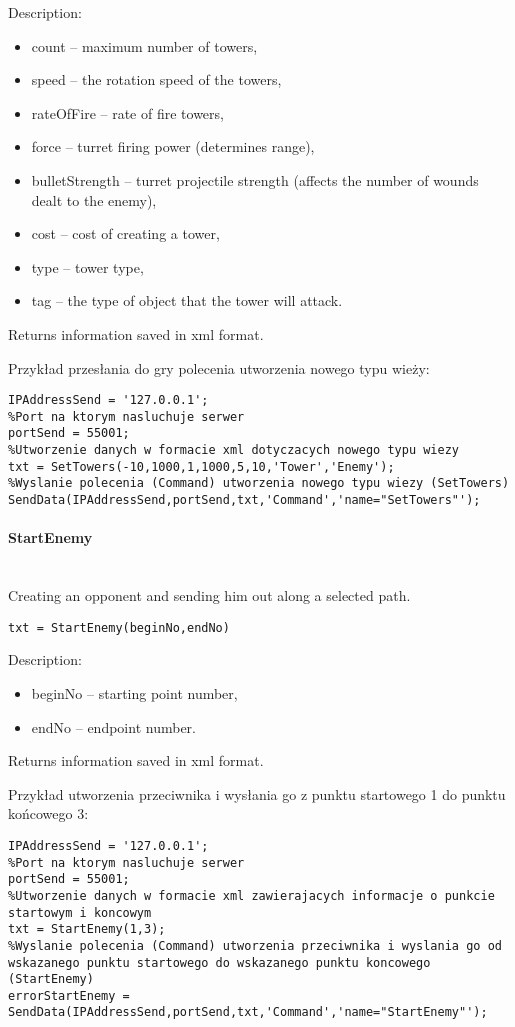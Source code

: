 Description:
\begin{itemize}
\item count -- maximum number of towers,
\item speed -- the rotation speed of the towers,
\item rateOfFire -- rate of fire towers,
\item force -- turret firing power (determines range),
\item bulletStrength -- turret projectile strength (affects the number of wounds dealt to the enemy),
\item cost -- cost of creating a tower,
\item type -- tower type,
\item tag -- the type of object that the tower will attack.
\end{itemize}

Returns information saved in xml format.

Przykład przesłania do gry polecenia utworzenia nowego typu wieży:
\begin{lstlisting}[style=Matlab-editor]
%Adres serwera
IPAddressSend = '127.0.0.1';
%Port na ktorym nasluchuje serwer
portSend = 55001;
%Utworzenie danych w formacie xml dotyczacych nowego typu wiezy
txt = SetTowers(-10,1000,1,1000,5,10,'Tower','Enemy');
%Wyslanie polecenia (Command) utworzenia nowego typu wiezy (SetTowers)
SendData(IPAddressSend,portSend,txt,'Command','name="SetTowers"');
\end{lstlisting}

\paragraph{StartEnemy} \hspace{0pt} \\

Creating an opponent and sending him out along a selected path.
\begin{lstlisting}[style=Matlab-editor]
txt = StartEnemy(beginNo,endNo)
\end{lstlisting}

Description:
\begin{itemize}
\item beginNo -- starting point number,
\item endNo -- endpoint number.
\end{itemize}

Returns information saved in xml format.

Przykład utworzenia przeciwnika i wysłania go z punktu startowego 1 do punktu końcowego 3: 
\begin{lstlisting}[style=Matlab-editor]
%Adres serwera
IPAddressSend = '127.0.0.1';
%Port na ktorym nasluchuje serwer
portSend = 55001;
%Utworzenie danych w formacie xml zawierajacych informacje o punkcie startowym i koncowym
txt = StartEnemy(1,3);
%Wyslanie polecenia (Command) utworzenia przeciwnika i wyslania go od wskazanego punktu startowego do wskazanego punktu koncowego (StartEnemy)
errorStartEnemy = SendData(IPAddressSend,portSend,txt,'Command','name="StartEnemy"');
\end{lstlisting}


